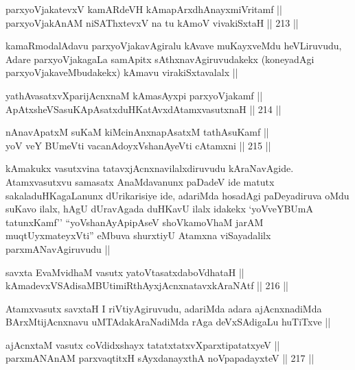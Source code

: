 \begin{shl}
parxyoVjakatevxV kamARdeVH kAmapArxdhAnayxmiVritamf || \\
parxyoVjakAnAM niSAThxtevxV na tu kAmoV vivakiSxtaH ||  213 ||  
\end{shl}

\begin{artha}
kamaRmodalAdavu parxyoVjakavAgiralu kAvave muKayxveMdu heVLiruvudu,
Adare parxyoVjakagaLa samApitx sAthxnavAgiruvudakekx (koneyadAgi
parxyoVjakaveMbudakekx) kAmavu virakiSxtavalalx ||
\end{artha}

\begin{shl}
yathAvasatxvXparijAcnxnaM kAmasAyxpi parxyoVjakamf ||  \\
ApAtxsheVSasuKApAsatxduHKatAvxdAtamxvasutxnaH ||  214 ||  
\end{shl}
				
\begin{shl}
nAnavApatxM suKaM kiMcinAnxnapAsatxM tathA\s suKamf || \\
yoV veY BUmeVti vacanAdoyxV\s shanAyeVti cA\s \s tamxni ||  215 ||  
\end{shl}


\begin{artha}
kAmakukx vasutxvina tatavxjAcnxnavilalxdiruvudu
kAraNavAgide. Atamxvasutxvu samasatx AnaMdavanunx paDadeV ide matutx
sakaladuHKagaLanunx dUrikarisiye ide, adariMda hosadAgi paDeyadiruva 
oMdu suKavo ilalx, hAgU dUravAgada duHKavU ilalx idakekx `yoVveYBUmA
tatunxKamf'' ``yoV\s shanAyApipAseV shoVkamoVhaM jarAM
muqtUyxmateyxVti'' eMbuva shurxtiyU Atamxna viSayadalilx
parxmANavAgiruvudu ||
\end{artha}

\begin{shl}
savxta EvaMvidhaM vasutx yatoV\s tasatxdaboVdhataH || \\
kAmadevxVSAdisaMBUtimiRthAyxjAcnxnatavxkAraNAtf ||  216 ||  
\end{shl}

\begin{artha}
Atamxvasutx savxtaH I riVtiyAgiruvudu, adariMda adara ajAcnxnadiMda
BArxMtijAcnxnavu uMTAdakAraNadiMda rAga deVxSAdigaLu huTiTxve ||
\end{artha}

\begin{shl}
ajAcnxtaM vasutx coVdidxshayx tatatxtatxvXparxtipatatxyeV || \\
parxmANAnAM parxvaqtitxH sAyxdanayxthA noVpapadayxteV ||  217 ||  
\end{shl}

